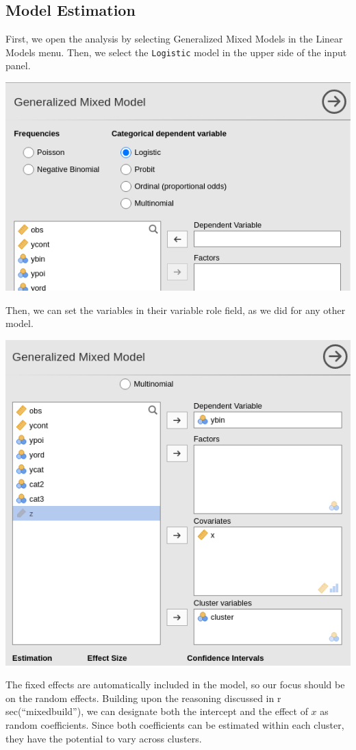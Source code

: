 \documentclass[
]{book}
\begin{document}
\hypertarget{model-estimation-4}{%
\subsection{Model Estimation}\label{model-estimation-4}}

First, we open the analysis by selecting {Generalized Mixed Models} in the {Linear Models} menu. Then, we select the \texttt{Logistic} model in the upper side of the input panel.

\includegraphics[width=0.8\linewidth]{bookletpics/5_logistic_input1}

Then, we can set the variables in their variable role field, as we did for any other model.

\includegraphics[width=0.8\linewidth]{bookletpics/5_logistic_input2}

The fixed effects are automatically included in the model, so our focus should be on the random effects. Building upon the reasoning discussed in r sec(``mixedbuild''), we can designate both the intercept and the effect of \(x\) as random coefficients. Since both coefficients can be estimated within each cluster, they have the potential to vary across clusters.
\end{document}
